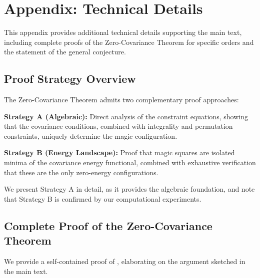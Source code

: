 \section{Appendix: Technical Details}
\label{sec:appendix}

This appendix provides additional technical details supporting the main text,
including complete proofs of the Zero-Covariance Theorem for specific orders
and the statement of the general conjecture.

\subsection{Proof Strategy Overview}

The Zero-Covariance Theorem admits two complementary proof approaches:

\textbf{Strategy A (Algebraic):} Direct analysis of the constraint equations, 
showing that the covariance conditions, combined with integrality and permutation constraints, 
uniquely determine the magic configuration.

\textbf{Strategy B (Energy Landscape):} Proof that magic squares are isolated minima 
of the covariance energy functional, combined with exhaustive verification 
that these are the only zero-energy configurations.

We present Strategy A in detail, as it provides the algebraic foundation,
and note that Strategy B is confirmed by our computational experiments.

\subsection{Complete Proof of the Zero-Covariance Theorem}

We provide a self-contained proof of ,
elaborating on the argument sketched in the main text.

